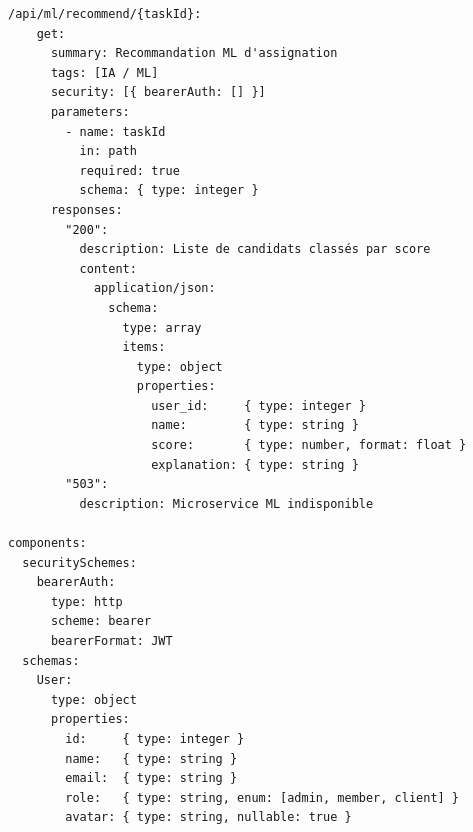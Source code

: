 \begin{lstlisting}[style=yamlstyle,caption={OpenAPI 3.0 — Endpoints d'authentification et de projets},label={lst:openapi}]
  /api/ml/recommend/{taskId}:
    get:
      summary: Recommandation ML d'assignation
      tags: [IA / ML]
      security: [{ bearerAuth: [] }]
      parameters:
        - name: taskId
          in: path
          required: true
          schema: { type: integer }
      responses:
        "200":
          description: Liste de candidats classés par score
          content:
            application/json:
              schema:
                type: array
                items:
                  type: object
                  properties:
                    user_id:     { type: integer }
                    name:        { type: string }
                    score:       { type: number, format: float }
                    explanation: { type: string }
        "503":
          description: Microservice ML indisponible

components:
  securitySchemes:
    bearerAuth:
      type: http
      scheme: bearer
      bearerFormat: JWT
  schemas:
    User:
      type: object
      properties:
        id:     { type: integer }
        name:   { type: string }
        email:  { type: string }
        role:   { type: string, enum: [admin, member, client] }
        avatar: { type: string, nullable: true }
\end{lstlisting}
